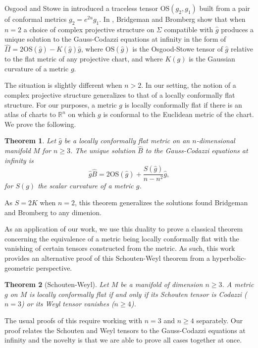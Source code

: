 \documentclass{amsart}
\newcommand{\R}{\mathbb{R}}
\newcommand{\two}{I\!\!I}
\newtheorem{bigthm}{Theorem}
\begin{document}
Osgood and Stowe in \cite{Osgood-Stowe1992} introduced a traceless tensor $\mathrm{OS}(g_2,g_1)$ built from a pair of conformal metrics $g_2 = e^{2u}g_1$.
In \cite{Bridgeman-Bromberg2022}, Bridgeman and Bromberg show that when $n = 2$ a choice of complex projective structure on $\Sigma$ compatible with $\hat{g}$ produces a unique solution to the Gauss-Codazzi equations at infinity in the form of $\hat{\two} = 2\mathrm{OS}(\hat{g}) - K(\hat{g})\hat{g}$, where $\mathrm{OS}(\hat{g})$ is the Osgood-Stowe tensor of $\hat{g}$ relative to the flat metric of any projective chart, and where $K(g)$ is the Gaussian curvature of a metric $g$.

The situation is slightly different when $n > 2$.
In our setting, the notion of a complex projective structure generalizes to that of a locally conformally flat structure. 
For our purposes, a metric $g$ is locally conformally flat if there is an atlas of charts to $\R^n$ on which $g$ is conformal to the Euclidean metric of the chart.
We prove the following.

\begin{bigthm}
Let $\hat{g}$ be a locally conformally flat metric on an $n$-dimensional manifold $M$ for $n \geq 3$.
The unique solution $\hat{B}$ to the Gauss-Codazzi equations at infinity is
\[
\hat{g}\hat{B} = 2\mathrm{OS}(\hat{g}) + \frac{S(\hat{g})}{n-n^2}\hat{g},
\]
for $S(g)$ the scalar curvature of a metric $g$.
\end{bigthm}
\noindent
As $S = 2K$ when $n=2$, this theorem generalizes the solutions found Bridgeman and Bromberg to any dimenion.

As an application of our work, we use this duality to prove a classical theorem concerning the equivalence of a metric being locally conformally flat with the vanishing of certain tensors constructed from the metric.
As such, this work provides an alternative proof of this Schouten-Weyl theorem from a hyperbolic-geometric perspective.

\begin{bigthm}[Schouten-Weyl]
Let $M$ be a manifold of dimension $n \geq 3$.
A metric $g$ on $M$ is locally conformally flat if and only if its Schouten tensor is Codazzi ($n = 3$) or its Weyl tensor vanishes ($n \geq 4$).
\end{bigthm}
\noindent
The usual proofs of this require working with $n=3$ and $n\geq 4$ separately.
Our proof relates the Schouten and Weyl tensors to the Gauss-Codazzi equations at infinity and the novelty is that we are able to prove all cases together at once. 
\end{document}
